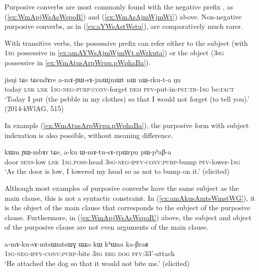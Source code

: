 Purposive converbs are most commonly found with the negative prefix , as (\ref{ex:WmApjWsAsWspoR}) and (\ref{ex:WmAsAjmWjmWt}) above. Non-negative purposive converbs, as in (\ref{ex:aYWsAstWstu}), are comparatively much rarer.

With transitive verbs, the possessive prefix can refer either to the subject (with \textsc{1sg} possessive  in \ref{ex:amAYWsAjmWjmWt.nWrkuta}) or the object (\textsc{3sg} possessive  in \ref{ex:WmAtusArpWrpu.pWphaBa}).

\begin{exe}
\ex \label{ex:amAYWsAjmWjmWt.nWrkuta}
\gll jisŋi tɕe tɕendɤre a-mɤ-ɲɯ-sɤ-jmɯ\redp{}jmɯt nɯ nɯ-rku-t-a ŋu \\
today \textsc{lnk} \textsc{lnk} \textsc{1sg}-\textsc{neg}-\textsc{purp}:\textsc{conv}-forget \textsc{dem} \textsc{pfv}-put-in-\textsc{pst}:\textsc{tr}-\textsc{1sg} be:\textsc{fact} \\
\glt `Today I put (the pebble in my clothes) so that I would not forget (to tell you).' (2014-kWlAG, 515)
\end{exe}

In example (\ref{ex:WmAtusArpWrpu.pWphaBa}), the purposive form  with subject indexation is also possible, without meaning difference.

\begin{exe}
\ex \label{ex:WmAtusArpWrpu.pWphaBa}
\gll kɯm ɲɯ-mbɤr tɕe, a-ku ɯ-mɤ-tu-sɤ-rpɯ\redp{}rpu pɯ-pʰaβ-a \\
door \textsc{sens}-low \textsc{lnk} \textsc{1sg.poss}-head \textsc{3sg-neg-ipfv-conv:purp}-bump \textsc{pfv}-lower-\textsc{1sg}\\
\glt `As the door is low, I lowered my head so as not to bump on it.' (elicited)
\end{exe}

Although most examples of purposive converbs have the same subject as the main clause, this is not a syntactic constraint. In (\ref{ex:amAkusAmtsWmstWG}), it is the object of the main clause  that corresponds to the subject of the purposive clause. Furthermore, in (\ref{ex:WmApjWsAsWspoR}) above, the subject and object of the purposive clause are not even arguments of the main clause.

\begin{exe}
\ex \label{ex:amAkusAmtsWmstWG}
\gll  a-mɤ-ku-sɤ-mtsɯ\redp{}mtsɯɣ ɯʑo kɯ kʰɯna ka-βraʁ \\
\textsc{1sg-neg-ipfv-conv:purp}-bite \textsc{3sg} \textsc{erg} \textsc{dog} \textsc{pfv}:3\fl{}3'-attach \\
\glt `He attached the dog so that it would not bite me.' (elicited)
\end{exe}

